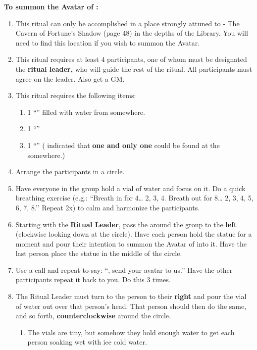 \documentclass[green]{GL2020}
\begin{document}
\textbf{To summon the Avatar of \cGenesis{}:}
\begin{enumerate}
  \item This ritual can only be accomplished in a place strongly attuned to \cGenesis{} - The Cavern of Fortune’s Shadow (page 48) in the depths of the Library. You will need to find this location if you wish to summon the Avatar.
  \item This ritual requires at least 4 participants, one of whom must be designated the \textbf{ritual leader,} who will guide the rest of the ritual. All participants must agree on the leader. Also get a GM.
  \item This ritual requires the following items:
    \begin{enumerate}
      \item 1 ``\iGlassVial{}'' filled with water from somewhere.
      \item 1 ``\iStoneFlower{}''
      \item 1 ``\iRabbitStatue{}''  (\cGenesis{} indicated that \textbf{one and only one} could be found at the \pSchool{} somewhere.)
    \end{enumerate}
  \item Arrange the participants in a circle.
  \item Have everyone in the group hold a vial of water and focus on it. Do a quick breathing exercise (e.g.: ``Breath in for 4… 2, 3, 4. Breath out for 8… 2, 3, 4, 5, 6, 7, 8.’’ Repeat 2x) to calm and harmonize the participants.
  \item Starting with the \textbf{Ritual Leader}, pass the \iRabbitStatue{} around the group to the \textbf{left} (clockwise looking down at the circle). Have each person hold the statue for a moment and pour their intention to summon the Avatar of \cGenesis{} into it. Have the last person place the statue in the middle of the circle.
  \item Use a call and repeat to say: ``\cGenesis{}, send your avatar to us.’’ Have the other participants repeat it back to you. Do this 3 times.
  \item The Ritual Leader must turn to the person to their \textbf{right} and pour the vial of water out over that person’s head. That person should then do the same, and so forth, \textbf{counterclockwise} around the circle.
    \begin{enumerate}
      \item The vials are tiny, but somehow they hold enough water to get each person soaking wet with ice cold water.
    \end{enumerate}

\end{enumerate}
\end{document}
